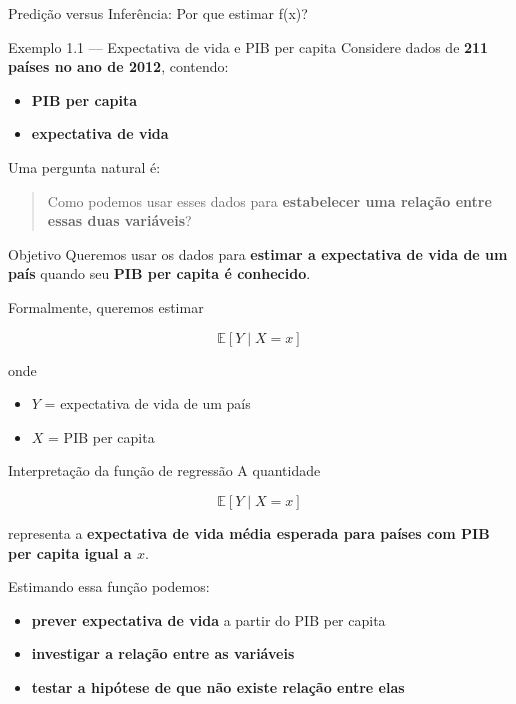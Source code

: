 \documentclass[
  ignorenonframetext,
  aspectratio=169,
]{beamer}
\providecommand{\tightlist}{%
  \setlength{\itemsep}{0pt}\setlength{\parskip}{0pt}}
\begin{document}
\begin{frame}{Predição versus Inferência: Por que estimar f(x)?}
\label{prediuxe7uxe3o-versus-inferuxeancia-por-que-estimar-fx}
\begin{block}{Exemplo 1.1 --- Expectativa de vida e PIB per capita}
\label{exemplo-1.1-expectativa-de-vida-e-pib-per-capita}
Considere dados de \textbf{211 países no ano de 2012}, contendo:

\begin{itemize}
\tightlist
\item
  \textbf{PIB per capita}
\item
  \textbf{expectativa de vida}
\end{itemize}

Uma pergunta natural é:

\begin{quote}
Como podemos usar esses dados para \textbf{estabelecer uma relação entre
essas duas variáveis}?
\end{quote}
\end{block}
\end{frame}

\begin{frame}
\begin{block}{Objetivo}
\label{objetivo}
Queremos usar os dados para \textbf{estimar a expectativa de vida de um
país} quando seu \textbf{PIB per capita é conhecido}.

Formalmente, queremos estimar

\[
\mathbb{E}[Y \mid X = x]
\]

onde

\begin{itemize}
\tightlist
\item
  \(Y\) = expectativa de vida de um país
\item
  \(X\) = PIB per capita
\end{itemize}
\end{block}
\end{frame}

\begin{frame}
\begin{block}{Interpretação da função de regressão}
\label{interpretauxe7uxe3o-da-funuxe7uxe3o-de-regressuxe3o}
A quantidade

\[
\mathbb{E}[Y \mid X = x]
\]

representa a \textbf{expectativa de vida média esperada para países com
PIB per capita igual a \(x\)}.

Estimando essa função podemos:

\begin{itemize}
\tightlist
\item
  \textbf{prever expectativa de vida} a partir do PIB per capita
\item
  \textbf{investigar a relação entre as variáveis}
\item
  \textbf{testar a hipótese de que não existe relação entre elas}
\end{itemize}
\end{block}
\end{frame}
\end{document}
